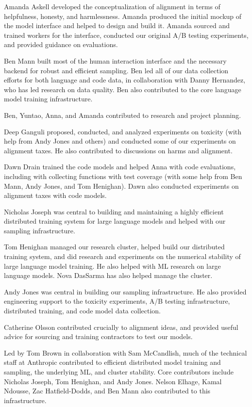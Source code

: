Amanda Askell developed the conceptualization of alignment in terms of helpfulness, honesty, and harmlessness.  Amanda produced the initial mockup of the model interface and helped to design and build it.  Amanda sourced and trained workers for the interface, conducted our original A/B testing experiments, and provided guidance on evaluations.  

Ben Mann built most of the human interaction interface and the necessary backend for robust and efficient sampling.  Ben led all of our data collection efforts for both language and code data, in collaboration with Danny Hernandez, who has led research on data quality.  Ben also contributed to the core language model training infrastructure.

Ben, Yuntao, Anna, and Amanda contributed to research and project planning.

Deep Ganguli proposed, conducted, and analyzed experiments on toxicity (with help from Andy Jones and others) and conducted some of our experiments on alignment taxes.  He also contributed to discussions on harms and alignment.

Dawn Drain trained the code models and helped Anna with code evaluations, including with collecting functions with test coverage (with some help from Ben Mann, Andy Jones, and Tom Henighan).  Dawn also conducted experiments on alignment taxes with code models.

Nicholas Joseph was central to building and maintaining a highly efficient distributed training system for large language models and helped with our sampling infrastructure. 

Tom Henighan managed our research cluster, helped build our distributed training system, and did research and experiments on the numerical stability of large language model training.  He also helped with ML research on large language models.  Nova DasSarma has also helped manage the cluster.

Andy Jones was central in building our sampling infrastructure. He also provided engineering support to the toxicity experiments, A/B testing infrastructure, distributed training, and code model data collection.

Catherine Olsson contributed crucially to alignment ideas, and provided useful advice for sourcing and training contractors to test our models.  

Led by Tom Brown in collaboration with Sam McCandlish, much of the technical staff at Anthropic contributed to efficient distributed model training and sampling, the underlying ML, and cluster stability.  Core contributors include Nicholas Joseph, Tom Henighan, and Andy Jones.  Nelson Elhage, Kamal Ndousse, Zac Hatfield-Dodds, and Ben Mann also contributed to this infrastructure.

